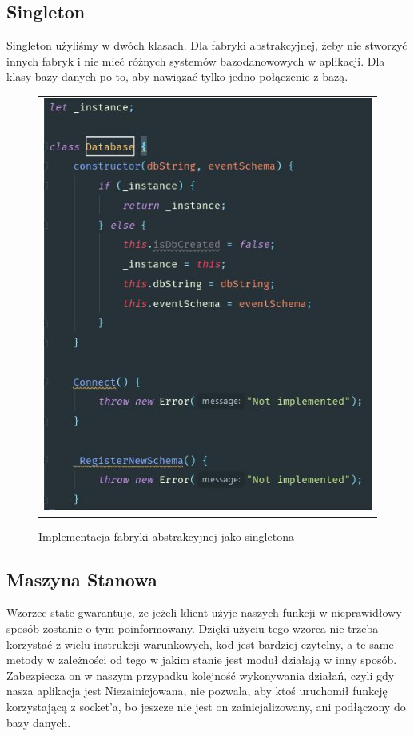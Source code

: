 \documentclass{sprawozdanie-agh}
\begin{document}
	\subsection{Singleton}
	
	Singleton użyliśmy w dwóch klasach. Dla fabryki abstrakcyjnej, żeby nie stworzyć innych fabryk i nie mieć różnych systemów bazodanowowych w aplikacji. Dla klasy bazy danych po to, aby	nawiązać tylko jedno połączenie z bazą.
	
	\begin{figure}[H] 
		\centering
		\begin{tabular}{c}
			\includegraphics[width=.75\textwidth]{singleton}
		\end{tabular} 
		\caption{Implementacja fabryki abstrakcyjnej jako singletona}
	\end{figure}
	
	\subsection{Maszyna Stanowa}
	
	Wzorzec state gwarantuje, że jeżeli klient użyje naszych funkcji w nieprawidłowy sposób zostanie o tym poinformowany. 
	Dzięki użyciu tego wzorca nie trzeba korzystać z wielu instrukcji warunkowych, kod jest bardziej czytelny, a te same metody w zależności od tego w jakim stanie jest moduł działają w inny sposób. Zabezpiecza on w naszym przypadku kolejność wykonywania działań, czyli gdy nasza aplikacja jest Niezainicjowana, nie pozwala, aby ktoś uruchomił funkcję korzystającą z socket’a, bo jeszcze nie jest on zainicjalizowany, ani podłączony do bazy danych.
	
\end{document}
